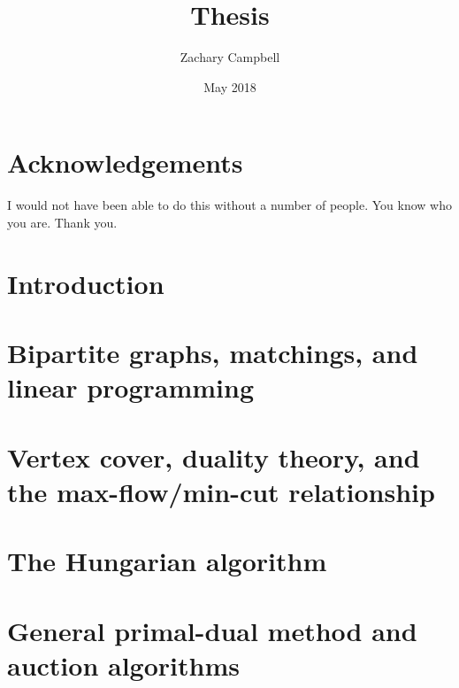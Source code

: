 \documentclass[12pt,twoside]{reedthesis}
\title{Thesis}
\author{Zachary Campbell}
\date{May 2018}
\renewcommand{\'}{^{'}}
\theoremstyle{plain}
\theoremstyle{definition}
\begin{document}
    \maketitle
    \frontmatter %
    \pagestyle{empty} %

\chapter*{Acknowledgements}
I would not have been able to do this without a number of people. You know who you are. Thank you.

\tableofcontents

\mainmatter %
\pagestyle{fancyplain} %
\chapter*{Introduction}

	
	
\chapter{Bipartite graphs, matchings, and linear programming}



\chapter{Vertex cover, duality theory, and the max-flow/min-cut relationship}



\chapter{The Hungarian algorithm}



\chapter{General primal-dual method and auction algorithms}


	

\backmatter %

\nocite{*}


\end{document}
